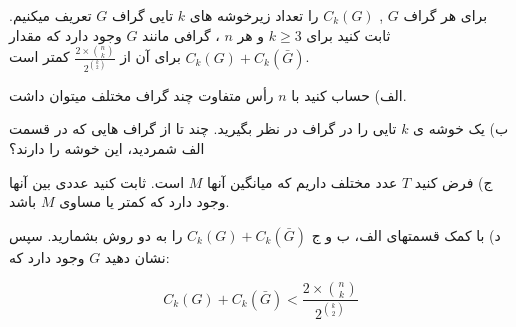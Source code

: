 \exercise
برای هر گراف 
$G$
,
$C_k(G)$
 را تعداد زيرخوشه های 
$k$
 تايی گراف 
$G$
  تعريف میکنيم. ثابت کنيد برای 
$k \geq 3$
و هر 
$n$
، گرافی مانند 
$G$
 وجود دارد که مقدار 
$C_k(G) + C_k(\bar{G})$
  برای آن از 
$\frac{2 \times \binom n k}{2 ^{\binom k 2}}$
   کمتر است.

الف) حساب کنيد با 
$n$
 رأس متفاوت چند گراف مختلف میتوان داشت.
  
ب) يک خوشه ی 
$k$
تايی را در گراف در نظر بگيريد. چند تا از گراف هايی که در قسمت الف شمرديد، اين
خوشه را دارند؟
 
ج) فرض کنيد 
$T$
 عدد مختلف داريم که ميانگين آنها 
$M$
 است. ثابت کنيد عددی بين آنها وجود دارد که کمتر
يا مساوی 
$M$
 باشد.
 
د) با کمک قسمتهای الف، ب و ج 
$C_k(G) + C_k(\bar{G})$
را به دو روش بشماريد. سپس نشان دهيد 
$G$
 وجود دارد که:
 
$$C_k(G) + C_k(\bar{G}) < \frac{2 \times \binom n k}{2 ^{\binom k 2}}$$